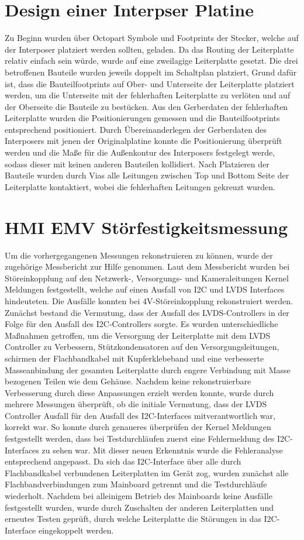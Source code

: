 \documentclass[praktikum,german]{hgbthesis}
\begin{document}
\section{Design einer Interpser Platine}
Zu Beginn wurden über Octopart Symbole und Footprints der Stecker, welche auf der Interposer platziert werden sollten, geladen. Da das Routing der Leiterplatte relativ einfach sein würde, wurde auf eine zweilagige Leiterplatte gesetzt. Die drei betroffenen Bauteile wurden jeweils doppelt im Schaltplan platziert, Grund dafür ist, dass die Bauteilfootprints auf Ober- und Unterseite der Leiterplatte platziert werden, um die Unterseite mit der fehlerhaften Leiterplatte zu verlöten und auf der Oberseite die Bauteile zu bestücken. Aus den Gerberdaten der fehlerhaften Leiterplatte wurden die Positionierungen gemessen und die  Bauteilfootprints entsprechend positioniert. Durch Übereinanderlegen der Gerberdaten des Interposers mit jenen der Originalplatine konnte die Positionierung überprüft werden und die Maße für die Außenkontur des Interposers festgelegt werde, sodass dieser mit keinen anderen Bauteilen kollidiert. Nach Platzieren der Bauteile wurden durch Vias alle Leitungen zwischen Top und Bottom Seite der Leiterplatte kontaktiert, wobei die fehlerhaften Leitungen gekreuzt wurden.

\section{HMI EMV Störfestigkeitsmessung}
Um die vorhergegangenen Messungen rekonstruieren zu können, wurde der zugehörige Messbericht zur Hilfe genommen. Laut dem Messbericht wurden bei Störeinkopplung auf den Netzwerk-, Versorgungs- und Kameraleitungen Kernel Meldungen festgestellt, welche auf einen Ausfall von I2C und LVDS Interfaces hindeuteten.
Die Ausfälle konnten bei 4V-Störeinkopplung rekonstruiert werden. Zunächst bestand die Vermutung, dass der Ausfall des LVDS-Controllers in der Folge für den Ausfall des I2C-Controllers sorgte. Es wurden unterschiedliche Maßnahmen getroffen, um die Versorgung der Leiterplatte mit dem LVDS Controller zu Verbessern, Stützkondensatoren auf den Versorgungsleitungen, schirmen der Flachbandkabel mit Kupferklebeband und eine verbesserte Masseanbindung der gesamten Leiterplatte durch engere Verbindung mit Masse bezogenen Teilen wie dem Gehäuse. Nachdem keine rekonstruierbare Verbesserung durch diese Anpassungen erzielt werden konnte, wurde durch mehrere Messungen überprüft, ob die initiale Vermutung, dass der LVDS Controller Ausfall für den Ausfall des I2C-Interfaces mitverantwortlich war, korrekt war. So konnte durch genaueres überprüfen der Kernel Meldungen festgestellt werden, dass bei Testdurchläufen zuerst eine Fehlermeldung des I2C-Interfaces zu sehen war. Mit dieser neuen Erkenntnis wurde die Fehleranalyse entsprechend angepasst. Da sich das I2C-Interface über alle durch Flachbandkabel verbundenen Leiterplatten im Gerät zog, wurden zunächst alle Flachbandverbindungen zum Mainboard getrennt und die Testdurchläufe wiederholt. Nachdem bei alleinigem Betrieb des Mainboards keine Ausfälle festgestellt wurden, wurde durch Zuschalten der anderen Leiterplatten und erneutes Testen geprüft, durch welche Leiterplatte die Störungen in das I2C-Interface eingekoppelt werden.
\end{document}
